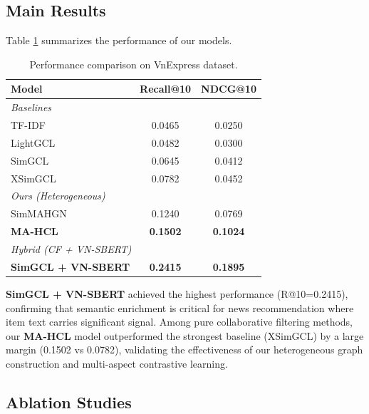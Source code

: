 \documentclass[11pt]{article}
\begin{document}
\subsection{Main Results}
Table \ref{tab:results} summarizes the performance of our models.

\begin{table}[h]
    \centering
    \small
    \begin{tabular}{lcc}
        \hline
        \textbf{Model}             & \textbf{Recall@10} & \textbf{NDCG@10} \\
        \hline
        \multicolumn{3}{l}{\textit{Baselines}}                             \\
        TF-IDF                     & 0.0465             & 0.0250           \\
        LightGCL                   & 0.0482             & 0.0300           \\
        SimGCL                     & 0.0645             & 0.0412           \\
        XSimGCL                    & 0.0782             & 0.0452           \\
        \hline
        \multicolumn{3}{l}{\textit{Ours (Heterogeneous)}}                  \\
        SimMAHGN                   & 0.1240             & 0.0769           \\
        \textbf{MA-HCL}            & \textbf{0.1502}    & \textbf{0.1024}  \\
        \hline
        \multicolumn{3}{l}{\textit{Hybrid (CF + VN-SBERT)}}                \\
        \textbf{SimGCL + VN-SBERT} & \textbf{0.2415}    & \textbf{0.1895}  \\
        \hline
    \end{tabular}
    \caption{Performance comparison on VnExpress dataset.}
    \label{tab:results}
\end{table}

\textbf{SimGCL + VN-SBERT} achieved the highest performance (R@10=0.2415), confirming that semantic enrichment is critical for news recommendation where item text carries significant signal. Among pure collaborative filtering methods, our \textbf{MA-HCL} model outperformed the strongest baseline (XSimGCL) by a large margin (0.1502 vs 0.0782), validating the effectiveness of our heterogeneous graph construction and multi-aspect contrastive learning.

\subsection{Ablation Studies}
\end{document}
